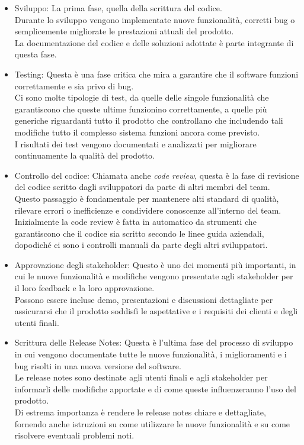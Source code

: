 \begin{itemize}
  \item Sviluppo: La prima fase, quella della scrittura del codice.\\ Durante lo
    sviluppo vengono implementate nuove funzionalità, corretti bug o
    semplicemente migliorate le prestazioni attuali del prodotto.\\ La
    documentazione del codice e delle soluzioni adottate è parte integrante di
    questa fase.

  \item Testing: Questa è una fase critica che mira a garantire che il software
    funzioni correttamente e sia privo di bug.\\ Ci sono molte tipologie di test,
    da quelle delle singole funzionalità che garantiscono che queste ultime funzionino
    correttamente, a quelle più generiche riguardanti tutto il prodotto che
    controllano che includendo tali modifiche tutto il complesso sistema
    funzioni ancora come previsto.\\ I risultati dei test vengono documentati e
    analizzati per migliorare continuamente la qualità del prodotto.

  \item Controllo del codice: Chiamata anche \textit{code review}, questa è la
    fase di revisione del codice scritto dagli sviluppatori da parte di altri
    membri del team.\\ Questo passaggio è fondamentale per mantenere alti
    standard di qualità, rilevare errori o inefficienze e condividere conoscenze
    all'interno del team.\\ Inizialmente la code review è fatta in automatico da
    strumenti che garantiscono che il codice sia scritto secondo le linee guida aziendali,
    dopodiché ci sono i controlli manuali da parte degli altri sviluppatori.

  \item Approvazione degli stakeholder: Questo è uno dei momenti più importanti,
    in cui le nuove funzionalità e modifiche vengono presentate agli stakeholder
    per il loro feedback e la loro approvazione.\\ Possono essere incluse demo,
    presentazioni e discussioni dettagliate per assicurarsi che il prodotto
    soddisfi le aspettative e i requisiti dei clienti e degli utenti finali.

  \item Scrittura delle Release Notes: Questa è l'ultima fase del processo di
    sviluppo in cui vengono documentate tutte le nuove funzionalità, i miglioramenti
    e i bug risolti in una nuova versione del software.\\ Le release notes sono destinate
    agli utenti finali e agli stakeholder per informarli delle modifiche apportate
    e di come queste influenzeranno l'uso del prodotto.\\ Di estrema importanza è
    rendere le release notes chiare e dettagliate, fornendo anche istruzioni su
    come utilizzare le nuove funzionalità e su come risolvere eventuali problemi
    noti.
\end{itemize}

